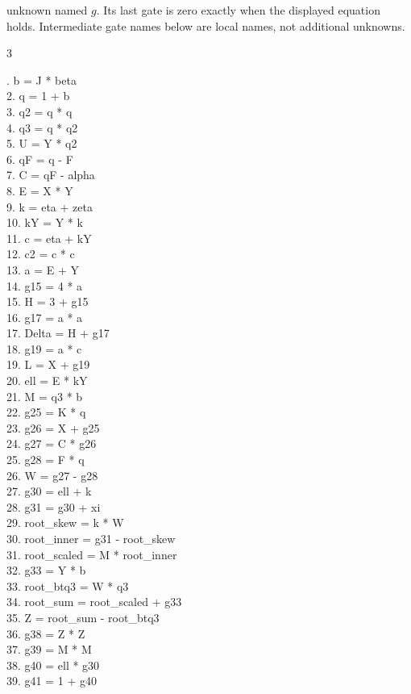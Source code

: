 \documentclass[10pt]{article}
\begin{document}
unknown named $g$. Its last gate is zero
exactly when the displayed equation holds. Intermediate gate names below are
local names, not additional unknowns.
\begin{multicols}{3}
\raggedright\ttfamily\fontsize{7.2}{8.4}. b = J * beta\\
2. q = 1 + b\\
3. q2 = q * q\\
4. q3 = q * q2\\
5. U = Y * q2\\
6. qF = q - F\\
7. C = qF - alpha\\
8. E = X * Y\\
9. k = eta + zeta\\
10. kY = Y * k\\
11. c = eta + kY\\
12. c2 = c * c\\
13. a = E + Y\\
14. g15 = 4 * a\\
15. H = 3 + g15\\
16. g17 = a * a\\
17. Delta = H + g17\\
18. g19 = a * c\\
19. L = X + g19\\
20. ell = E * kY\\
21. M = q3 * b\\
22. g25 = K * q\\
23. g26 = X + g25\\
24. g27 = C * g26\\
25. g28 = F * q\\
26. W = g27 - g28\\
27. g30 = ell + k\\
28. g31 = g30 + xi\\
29. root\_skew = k * W\\
30. root\_inner = g31 - root\_skew\\
31. root\_scaled = M * root\_inner\\
32. g33 = Y * b\\
33. root\_btq3 = W * q3\\
34. root\_sum = root\_scaled + g33\\
35. Z = root\_sum - root\_btq3\\
36. g38 = Z * Z\\
37. g39 = M * M\\
38. g40 = ell * g30\\
39. g41 = 1 + g40\\

\end{multicols}
\end{document}
